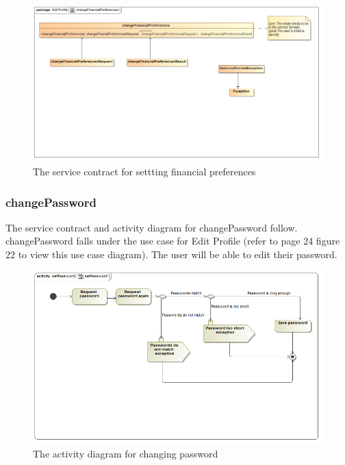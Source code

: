 \documentclass[a4paper,12pt]{article}
\begin{document}
\begin{figure}[H]
	\centering
	\includegraphics[width=1.0\textwidth]{../Diagrams/ManageProfile/serviceContracts/changeFinancialPreferencesServiceContract.png}
	\caption{The service contract for settting financial preferences}
\end{figure}

\subsubsection{changePassword}
The service contract and activity diagram for changePassword follow. changePassword falls under the use case for Edit Profile (refer to page 24 figure 22 to view this use case diagram). The user will be able to edit their password.
\begin{figure}[H]
  \centering
    \includegraphics[width=1.0\textwidth]{../Diagrams/ManageProfile/ActivityDiagrams/setPassword1.png}
    \caption{The activity diagram for changing password} 
\end{figure}
	
\end{document}

